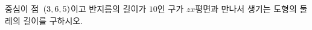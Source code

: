 중심이 점~$(3{,}\mkern3mu\mathopen{}6{,}\mkern3mu\mathopen{}5)$이고 반지름의 길이가 $10$인 구가 $zx$평면과 만나서 생기는 도형의 둘레의 길이를 구하시오.
